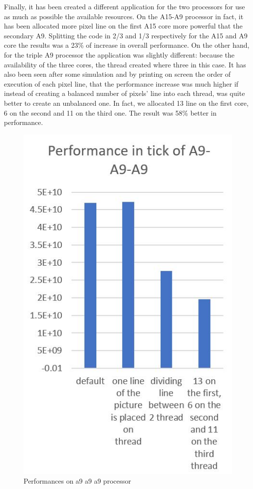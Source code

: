 \documentclass[journal]{IEEEtran}
\begin{document}
Finally, it has been created a different application for the two processors for use as much as possible the available resources. On the A15-A9 processor in fact, it has been allocated more pixel line on the first A15 core more powerful that the secondary A9. Splitting the code in 2/3 and 1/3 respectively for the A15 and A9 core the results was a 23\% of increase in overall performance.
On the other hand, for the triple A9 processor the application was slightly different: because the availability of the three cores, the thread created where three in this case. It has also been seen after some simulation and by printing on screen the order of execution of each pixel line, that the performance increase was much higher if instead of creating a balanced number of pixels’ line into each thread, was quite better to create an unbalanced one. In fact, we allocated 13 line on the first core, 6 on the second and 11 on the third one. The result was 58\% better in performance.





\begin{figure}[!h]
	\centering
	\includegraphics[width=.8\linewidth]{a9a9a9}
	\caption{Performances on a9 a9 a9 processor}
	\label{fig:a9a9a9}
\end{figure}
\end{document}
